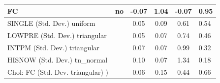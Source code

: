 \begin{table}
\begin{center}
\begin{tabular}{|l|l|c|c|c|l|}
			\hline
			FC & no & -0.07 & 1.04 & -0.07 & 0.95 \\
			\hline
			SINGLE (Std. Dev.) uniform &  & 0.05 & 0.09 & 0.61 & 0.54 \\
			\hline
			LOWPRE (Std. Dev.) triangular &  & 0.05 & 0.07 & 0.74 & 0.46 \\
			\hline
			INTPM (Std. Dev.) triangular &  & 0.07 & 0.07 & 0.99 & 0.32 \\
			\hline
			HISNOW (Std. Dev.) tn_normal &  & 0.10 & 0.07 & 1.34 & 0.18 \\
			\hline
			 Chol: FC (Std. Dev. triangular) ) &  & 0.06 & 0.15 & 0.44 & 0.66 \\
			\hline
		\end{tabular}
	\end{center}
\end{table}